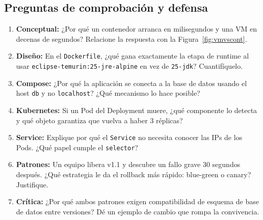 \documentclass[11pt,a4paper]{article}
\begin{document}
\subsection{Preguntas de comprobaci\'on y defensa}

\begin{enumerate}
\item \textbf{Conceptual:} ¿Por qu\'e un contenedor arranca en milisegundos y una VM en decenas de segundos? Relacione la respuesta con la Figura~\ref{fig:vmvscont}.
\item \textbf{Dise\~no:} En el \texttt{Dockerfile}, ¿qu\'e gana exactamente la etapa de runtime al usar \texttt{eclipse-temurin:25-jre-alpine} en vez de \texttt{25-jdk}? Cuantif\'iquelo.
\item \textbf{Compose:} ¿Por qu\'e la aplicaci\'on se conecta a la base de datos usando el host \texttt{db} y no \texttt{localhost}? ¿Qu\'e mecanismo lo hace posible?
\item \textbf{Kubernetes:} Si un Pod del Deployment muere, ¿qu\'e componente lo detecta y qu\'e objeto garantiza que vuelva a haber 3 r\'eplicas?
\item \textbf{Service:} Explique por qu\'e el \texttt{Service} no necesita conocer las IPs de los Pods. ¿Qu\'e papel cumple el \texttt{selector}?
\item \textbf{Patrones:} Un equipo libera v1.1 y descubre un fallo grave 30 segundos despu\'es. ¿Qu\'e estrategia le da el rollback m\'as r\'apido: blue-green o canary? Justifique.
\item \textbf{Cr\'itica:} ¿Por qu\'e ambos patrones exigen compatibilidad de esquema de base de datos entre versiones? D\'e un ejemplo de cambio que rompa la convivencia.
\end{enumerate}
\end{document}
